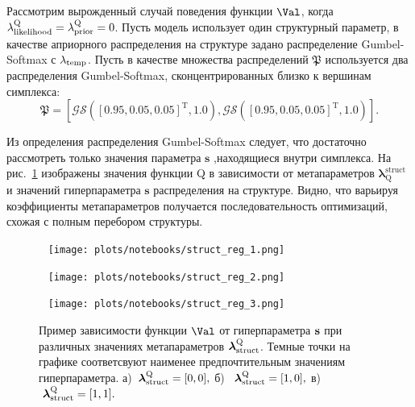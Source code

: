 \begin{example} 
Рассмотрим вырожденный случай поведения функции $\Val$, когда $\lambda_\text{likelihood}^\text{Q} = \lambda_\text{prior}^\text{Q} = 0$. Пусть модель использует один структурный параметр, в качестве априорного распределения на структуре задано распределение Gumbel-Softmax с $\lambda_{\text{temp}}$. Пусть в качестве множества распределений $\mathfrak{P}$ используется два распределения Gumbel-Softmax, сконцентрированных близко к вершинам симплекса:
\[
    \mathfrak{P} = [\mathcal{GS}([0.95, 0.05, 0.05]^\text{T}, 1.0) ,\mathcal{GS}([0.95, 0.05, 0.05]^{\text{T}}, 1.0)].
\]

Из определения распределения Gumbel-Softmax следует, что достаточно рассмотреть только значения параметра $\mathbf{s}$ ,находящиеся внутри симплекса.
На рис.~\ref{fig:gs_comb} изображены значения функции Q в зависимости от метапараметров $\boldsymbol{\lambda}^\text{struct}_\text{Q}$ и значений гиперпараметра $\mathbf{s}$ распределения на структуре. Видно, что варьируя  коэффициенты метапараметров получается последовательность оптимизаций, схожая с полным перебором структуры.
\end{example}


\begin{figure}
 \begin{minipage}[t]{.32\textwidth}
   \texttt{[image: plots/notebooks/struct\_reg\_1.png]}
\subcaption{}
\end{minipage}
\hfill
 \begin{minipage}[t]{.32\textwidth}
   \texttt{[image: plots/notebooks/struct\_reg\_2.png]}
\subcaption{}
\end{minipage}
\hfill
 \begin{minipage}[t]{.32\textwidth}
   \texttt{[image: plots/notebooks/struct\_reg\_3.png]}
\subcaption{}
\end{minipage}

\caption{Пример зависимости функции $\Val$ от гиперпараметра $\mathbf{s}$ при различных значениях метапараметров $\boldsymbol{\lambda}_\text{struct}^\text{Q}$. Темные точки на графике соответсвуют наименее предпочтительным значениям гиперпараметра. а)~$\boldsymbol{\lambda}_\text{struct}^\text{Q} = [0,0],$ б)~$~\boldsymbol{\lambda}_\text{struct}^\text{Q} = [1,0],$ в)~$~\boldsymbol{\lambda}_\text{struct}^\text{Q} = [1,1].$}
\label{fig:gs_comb}

\end{figure}

